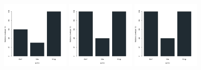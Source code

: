 \begin{figure}[H]
\centering
\includegraphics[width=0.3\textwidth]{img/solver_instance_coverage_b=3_m_600s.png}
\includegraphics[width=0.3\textwidth]{img/solver_instance_coverage_b=3_m_1200s.png}
\includegraphics[width=0.3\textwidth]{img/solver_instance_coverage_b=3_m_1800s.png}
\caption*{\textsc{Zeitlimit} $10min$ $\quad\quad\quad$ \textsc{Zeitlimit} $20min$ $\quad\quad\quad$ \textsc{Zeitlimit} $30min$}
\begin{subfigure}[b]{0.3\textwidth}
\centering
{}

\end{subfigure}
\end{figure}
